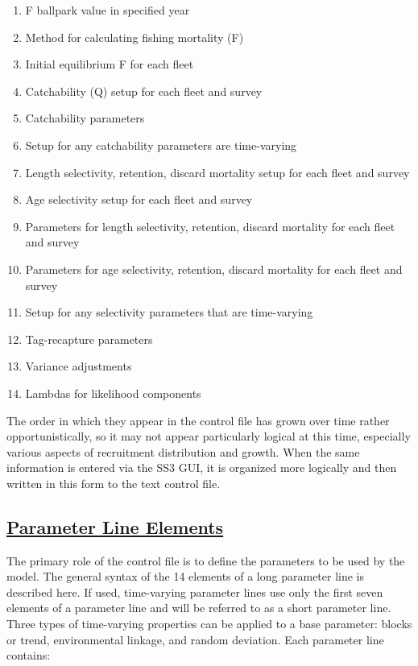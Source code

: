 \begin{enumerate}
		\item F ballpark value in specified year
		\item Method for calculating fishing mortality (F)
		\item Initial equilibrium F for each fleet
		\\
		\item Catchability (Q) setup for each fleet and survey
		\item Catchability parameters
		\item Setup for any catchability parameters are time-varying
		\\
		\item Length selectivity, retention, discard mortality setup for each fleet and survey
		\item Age selectivity setup for each fleet and survey
		\item Parameters for length selectivity, retention, discard mortality for each fleet and survey
		\item Parameters for age selectivity, retention, discard mortality for each fleet and survey
		\item Setup for any selectivity parameters that are time-varying
		\\
		\item Tag-recapture parameters
		\\
		\item Variance adjustments
		\item Lambdas for likelihood components
	\end{enumerate}
The order in which they appear in the control file has grown over time rather opportunistically, so it may not appear particularly logical at this time, especially various aspects of recruitment distribution and growth. When the same information is entered via the SS3 GUI, it is organized more logically and then written in this form to the text control file.

\hypertarget{ParameterLine}{}
\subsection[Parameter Line Elements]{\protect\hyperlink{ParameterLine}{Parameter Line Elements}}
The primary role of the control file is to define the parameters to be used by the model. The general syntax of the 14 elements of a long parameter line is described here. If used, time-varying parameter lines use only the first seven elements of a parameter line and will be referred to as a short parameter line. Three types of time-varying properties can be applied to a base parameter: blocks or trend, environmental linkage, and random deviation. Each parameter line contains:

